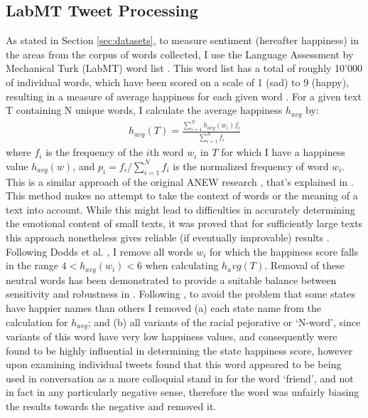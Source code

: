 \documentclass{llncs}
\begin{document}
\subsection{LabMT Tweet Processing}
\label{sec:meth1}
As stated in Section \ref{sec:datasets}, to measure sentiment (hereafter happiness) in the areas from the corpus of words collected, I use the Language Assessment by Mechanical Turk (LabMT) word list \cite{Dodds2011}. This word list has a total of roughly 10'000 of individual words, which have been scored on a scale of 1 (sad) to 9 (happy), resulting in a measure of average happiness for each given word \cite{Kloumann2012}. For a given text T containing N unique words, I calculate the average happiness $h_{avg}$ by:
\begin{align*}
h_{avg}(T) = \frac{\sum_{i=1}^{N} h_{avg}(w_i)f_i}{\sum_{i=1}^{N} f_i} \tag{1}\label{eq:1}
\end{align*}
where $f_i$ is the frequency of the $i$th word $w_i$ in $T$ for which I have a happiness value $h_{avg}(w)$, and $p_i = f_i/\sum_{i=1}^{N}f_i$ is the normalized frequency of word $w_i$. This is a similar approach of the original ANEW research \cite{Bradley1999}, that's explained in \cite{Dodds2009}.
This method makes no attempt to take the context of words or the meaning of a text into account. While this might lead to difficulties in accurately determining the emotional content of small texts, it was proved that for sufficiently large texts this approach nonetheless gives reliable (if eventually improvable) results \cite{Dodds2011,Mitchell2013,Dodds2009,Kloumann2012}.
Following Dodds et al. \cite{Dodds2011}, I remove all words $w_i$ for which the happiness score falls in the range $4 < h_{avg}(w_i) < 6$ when calculating $h_avg(T)$. Removal of these neutral words has been demonstrated to provide a suitable balance between sensitivity and robustness in \cite{Dodds2011}. Following \cite{Mitchell2013}, to avoid the problem that some states have happier names than others I removed (a) each state name from the calculation for $h_{avg}$; and (b) all variants of the racial pejorative or ‘N-word’, since variants of this word have very low happiness values, and consequently were found to be highly influential in determining the state happiness score, however upon examining individual tweets \cite{Mitchell2013} found that this word appeared to be being used in conversation as a more colloquial stand in for the word `friend', and not in fact in any particularly negative sense, therefore the word was unfairly biasing \cite{Mitchell2013} the results towards the negative and removed it.
\end{document}
